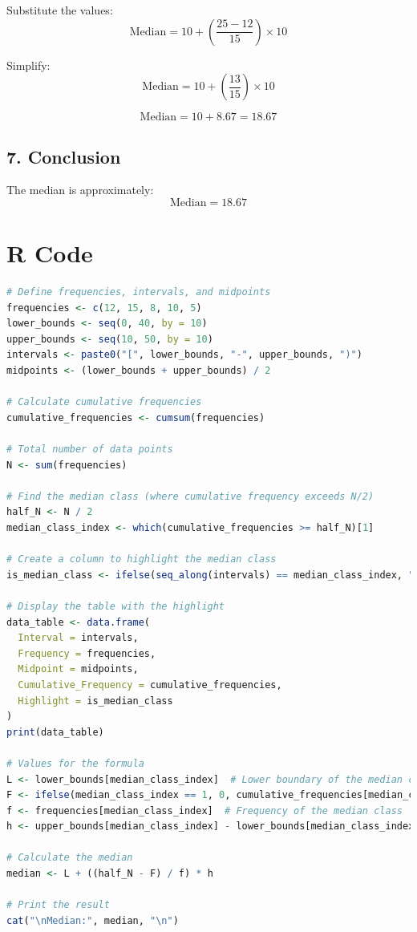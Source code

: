 \documentclass[10pt]{book}
\begin{document}
Substitute the values:
\[
\text{Median} = 10 + \left( \frac{25 - 12}{15} \right) \times 10
\]

Simplify:
\[
\text{Median} = 10 + \left( \frac{13}{15} \right) \times 10
\]

\[
\text{Median} = 10 + 8.67 = 18.67
\]

\subsection*{7. Conclusion}
The median is approximately:
\[
\text{Median} = 18.67
\]



\section*{R Code}
\begin{lstlisting}[language=R, caption={R Code for Calculating median}, label={lst:median}]
# Define frequencies, intervals, and midpoints
frequencies <- c(12, 15, 8, 10, 5)
lower_bounds <- seq(0, 40, by = 10)
upper_bounds <- seq(10, 50, by = 10)
intervals <- paste0("[", lower_bounds, "-", upper_bounds, ")")
midpoints <- (lower_bounds + upper_bounds) / 2

# Calculate cumulative frequencies
cumulative_frequencies <- cumsum(frequencies)

# Total number of data points
N <- sum(frequencies)

# Find the median class (where cumulative frequency exceeds N/2)
half_N <- N / 2
median_class_index <- which(cumulative_frequencies >= half_N)[1]

# Create a column to highlight the median class
is_median_class <- ifelse(seq_along(intervals) == median_class_index, "Median Class", "")

# Display the table with the highlight
data_table <- data.frame(
  Interval = intervals,
  Frequency = frequencies,
  Midpoint = midpoints,
  Cumulative_Frequency = cumulative_frequencies,
  Highlight = is_median_class
)
print(data_table)

# Values for the formula
L <- lower_bounds[median_class_index]  # Lower boundary of the median class
F <- ifelse(median_class_index == 1, 0, cumulative_frequencies[median_class_index - 1])  # Cumulative frequency before the median class
f <- frequencies[median_class_index]  # Frequency of the median class
h <- upper_bounds[median_class_index] - lower_bounds[median_class_index]  # Width of the class interval

# Calculate the median
median <- L + ((half_N - F) / f) * h

# Print the result
cat("\nMedian:", median, "\n")
\end{lstlisting}
\end{document}
